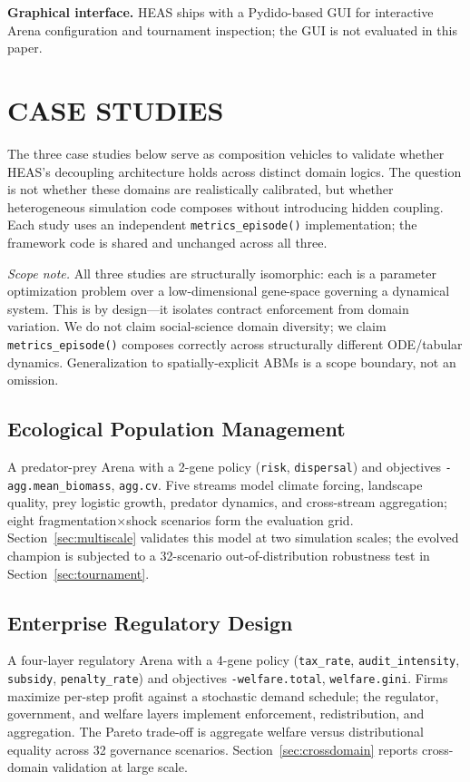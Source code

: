 \documentclass{wscpaperproc}
\begin{document}
\textbf{Graphical interface.} HEAS ships with a Pydido-based GUI for
interactive Arena configuration and tournament inspection; the GUI is not
evaluated in this paper.

\section{CASE STUDIES}

The three case studies below serve as composition vehicles to validate whether HEAS's decoupling architecture holds across distinct domain logics. The question is not whether these domains are realistically calibrated, but whether heterogeneous simulation code composes without introducing hidden coupling. Each study uses an independent \texttt{metrics\_episode()} implementation; the framework code is shared and unchanged across all three.

\textit{Scope note.} All three studies are structurally isomorphic: each is a
parameter optimization problem over a low-dimensional gene-space governing a
dynamical system. This is by design---it isolates contract enforcement from
domain variation. We do not claim social-science domain diversity; we claim
\texttt{metrics\_episode()} composes correctly across structurally different
ODE/tabular dynamics. Generalization to spatially-explicit ABMs is a scope
boundary, not an omission.

\subsection{Ecological Population Management}

A predator-prey Arena with a 2-gene policy (\texttt{risk},
\texttt{dispersal}) and objectives \texttt{-agg.mean\_biomass},
\texttt{agg.cv}. Five streams model climate forcing, landscape quality, prey
logistic growth, predator dynamics, and cross-stream aggregation; eight
fragmentation$\times$shock scenarios form the evaluation grid.
Section~\ref{sec:multiscale} validates this model at two simulation scales; the evolved champion
is subjected to a 32-scenario out-of-distribution robustness test in
Section~\ref{sec:tournament}.

\subsection{Enterprise Regulatory Design}

A four-layer regulatory Arena with a 4-gene policy
(\texttt{tax\_rate}, \texttt{audit\_intensity}, \texttt{subsidy},
\texttt{penalty\_rate}) and objectives \texttt{-welfare.total},
\texttt{welfare.gini}. Firms maximize per-step profit against a stochastic
demand schedule; the regulator, government, and welfare layers implement
enforcement, redistribution, and aggregation. The Pareto trade-off is
aggregate welfare versus distributional equality across 32 governance scenarios.
Section~\ref{sec:crossdomain} reports cross-domain validation at large scale.
\end{document}
